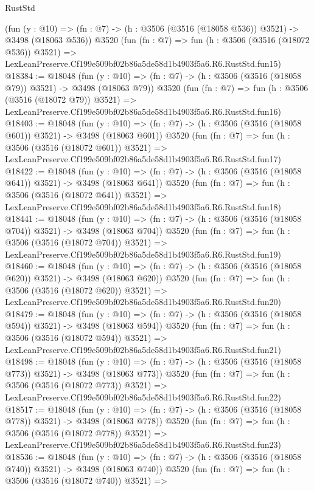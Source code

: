 \begin{lexlean}{RustStd}
\begin{coremodule}
    (fun (y : @10) => (fn : @7) -> (h : @3506 (@3516 (@18058 @536)) @3521) -> @3498 (@18063 @536))
    @3520
    (fun (fn : @7) =>
    fun (h : @3506 (@3516 (@18072 @536)) @3521) =>
    LexLeanPreserve.Cf199e509bf02b86a5de58d1b4903f5a6.R6.RustStd.fun15)
@18384 := @18048
    (fun (y : @10) => (fn : @7) -> (h : @3506 (@3516 (@18058 @79)) @3521) -> @3498 (@18063 @79))
    @3520
    (fun (fn : @7) =>
    fun (h : @3506 (@3516 (@18072 @79)) @3521) =>
    LexLeanPreserve.Cf199e509bf02b86a5de58d1b4903f5a6.R6.RustStd.fun16)
@18403 := @18048
    (fun (y : @10) => (fn : @7) -> (h : @3506 (@3516 (@18058 @601)) @3521) -> @3498 (@18063 @601))
    @3520
    (fun (fn : @7) =>
    fun (h : @3506 (@3516 (@18072 @601)) @3521) =>
    LexLeanPreserve.Cf199e509bf02b86a5de58d1b4903f5a6.R6.RustStd.fun17)
@18422 := @18048
    (fun (y : @10) => (fn : @7) -> (h : @3506 (@3516 (@18058 @641)) @3521) -> @3498 (@18063 @641))
    @3520
    (fun (fn : @7) =>
    fun (h : @3506 (@3516 (@18072 @641)) @3521) =>
    LexLeanPreserve.Cf199e509bf02b86a5de58d1b4903f5a6.R6.RustStd.fun18)
@18441 := @18048
    (fun (y : @10) => (fn : @7) -> (h : @3506 (@3516 (@18058 @704)) @3521) -> @3498 (@18063 @704))
    @3520
    (fun (fn : @7) =>
    fun (h : @3506 (@3516 (@18072 @704)) @3521) =>
    LexLeanPreserve.Cf199e509bf02b86a5de58d1b4903f5a6.R6.RustStd.fun19)
@18460 := @18048
    (fun (y : @10) => (fn : @7) -> (h : @3506 (@3516 (@18058 @620)) @3521) -> @3498 (@18063 @620))
    @3520
    (fun (fn : @7) =>
    fun (h : @3506 (@3516 (@18072 @620)) @3521) =>
    LexLeanPreserve.Cf199e509bf02b86a5de58d1b4903f5a6.R6.RustStd.fun20)
@18479 := @18048
    (fun (y : @10) => (fn : @7) -> (h : @3506 (@3516 (@18058 @594)) @3521) -> @3498 (@18063 @594))
    @3520
    (fun (fn : @7) =>
    fun (h : @3506 (@3516 (@18072 @594)) @3521) =>
    LexLeanPreserve.Cf199e509bf02b86a5de58d1b4903f5a6.R6.RustStd.fun21)
@18498 := @18048
    (fun (y : @10) => (fn : @7) -> (h : @3506 (@3516 (@18058 @773)) @3521) -> @3498 (@18063 @773))
    @3520
    (fun (fn : @7) =>
    fun (h : @3506 (@3516 (@18072 @773)) @3521) =>
    LexLeanPreserve.Cf199e509bf02b86a5de58d1b4903f5a6.R6.RustStd.fun22)
@18517 := @18048
    (fun (y : @10) => (fn : @7) -> (h : @3506 (@3516 (@18058 @778)) @3521) -> @3498 (@18063 @778))
    @3520
    (fun (fn : @7) =>
    fun (h : @3506 (@3516 (@18072 @778)) @3521) =>
    LexLeanPreserve.Cf199e509bf02b86a5de58d1b4903f5a6.R6.RustStd.fun23)
@18536 := @18048
    (fun (y : @10) => (fn : @7) -> (h : @3506 (@3516 (@18058 @740)) @3521) -> @3498 (@18063 @740))
    @3520
    (fun (fn : @7) =>
    fun (h : @3506 (@3516 (@18072 @740)) @3521) =>

\end{coremodule}
\end{lexlean}
